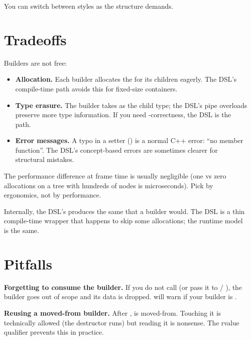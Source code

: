 You can switch between styles as the structure demands.

\section{Tradeoffs}

Builders are not free:

\begin{itemize}[leftmargin=*]
  \item \textbf{Allocation.} Each builder allocates the
     for its children eagerly. The DSL's
    compile-time path avoids this for fixed-size containers.
  \item \textbf{Type erasure.} The builder takes
     as the child type; the DSL's pipe overloads
    preserve more type information. If you need
    -correctness, the DSL is the path.
  \item \textbf{Error messages.} A typo in a setter
    () is a normal C++ error: ``no member
    function''. The DSL's concept-based errors are sometimes
    clearer for structural mistakes.
\end{itemize}

The performance difference at frame time is usually negligible
(one vs zero allocations on a tree with hundreds of nodes is
microseconds). Pick by ergonomics, not by performance.

\begin{aside}
Internally, the DSL's  produces the same
 that a builder would. The DSL is a thin
compile-time wrapper that happens to skip some allocations; the
runtime model is the same.
\end{aside}

\section{Pitfalls}

\begin{warning}
\textbf{Forgetting to consume the builder.} If you do not call
 (or pass it to  / ),
the builder goes out of scope and its data is dropped.
 will warn if your builder is
\code{[[nodiscard]]}.
\end{warning}

\begin{warning}
\textbf{Reusing a moved-from builder.} After
,  is moved-from. Touching it
is technically allowed (the destructor runs) but reading it is
nonsense. The rvalue qualifier prevents this in practice.
\end{warning}

